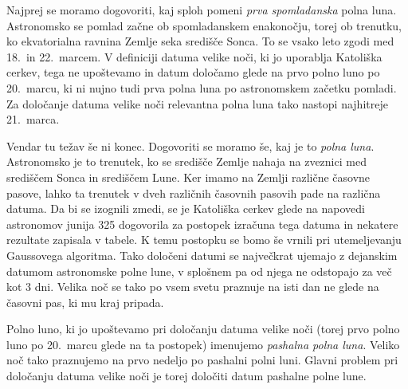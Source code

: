 



Najprej se moramo dogovoriti, kaj sploh pomeni \emph{prva spomladanska} 
polna luna. 
%
%
Astronomsko se pomlad začne ob spomladanskem enakonočju, torej ob trenutku, 
ko ekvatorialna ravnina Zemlje seka središče Sonca. To se vsako leto zgodi 
med 18.\ in 22.\ marcem. V definiciji datuma velike noči, ki jo uporablja 
Katoliška cerkev, tega ne upoštevamo in datum določamo glede na prvo 
polno luno po 20.\ marcu, ki ni nujno tudi prva polna luna po astronomskem
začetku pomladi. Za določanje datuma velike noči relevantna polna luna tako 
nastopi najhitreje 21.\ marca.

Vendar tu težav še ni konec. Dogovoriti se moramo še, kaj je to \emph{polna
luna}. Astronomsko je to trenutek, ko se središče Zemlje nahaja na zveznici 
med središčem Sonca in središčem Lune. Ker imamo na Zemlji različne časovne 
pasove, lahko ta trenutek v dveh različnih časovnih pasovih pade na različna 
datuma. Da bi se izognili zmedi, se je Katoliška cerkev glede na napovedi 
astronomov junija 325 dogovorila za postopek izračuna tega datuma in 
nekatere rezultate zapisala v tabele. K temu postopku se bomo še vrnili pri
utemeljevanju Gaussovega algoritma. Tako določeni datumi se največkrat 
ujemajo z dejanskim datumom astronomske polne lune, v splošnem pa od njega ne 
odstopajo za več kot 3 dni. Velika noč se tako po vsem svetu praznuje na 
isti dan ne glede na časovni pas, ki mu kraj pripada.

Polno luno, ki jo upoštevamo pri določanju datuma velike noči (torej prvo 
polno luno po 20.\ marcu glede na ta postopek) imenujemo \emph{pashalna 
polna luna}. Veliko noč tako praznujemo na prvo nedeljo po pashalni polni luni.
Glavni problem pri določanju datuma velike noči je torej določiti datum 
pashalne polne lune.





